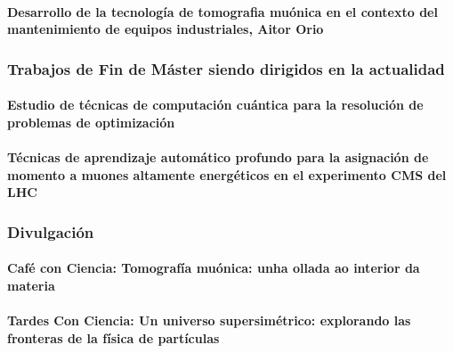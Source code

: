 \documentclass[a4paper, 11pt, twoside, openright]{report}
\begin{document}
\paragraph{Desarrollo de la tecnología de tomografia muónica en el contexto del mantenimiento de equipos industriales, Aitor Orio}


\subsubsection{Trabajos de Fin de Máster siendo dirigidos en la actualidad}

\paragraph{Estudio de técnicas de computación cuántica para la resolución de problemas de optimización}


\paragraph{Técnicas de aprendizaje automático profundo para la asignación de momento a muones altamente energéticos en el experimento CMS del LHC}


\subsubsection{Divulgación}

\paragraph{Café con Ciencia: Tomografía muónica: unha ollada ao interior da materia}


\paragraph{Tardes Con Ciencia: Un universo supersimétrico: explorando las fronteras de la física de partículas}

\end{document}
